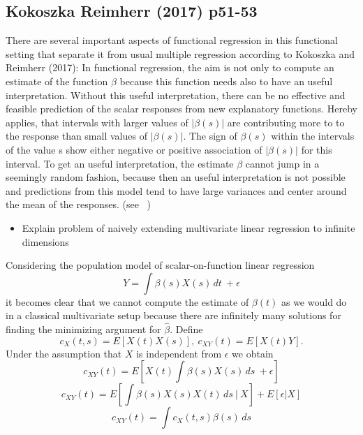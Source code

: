 \documentclass[11pt,twoside,a4paper]{article}
\begin{document}
\subsection{Kokoszka Reimherr (2017) p51-53}
There are several important aspects of functional regression in this functional setting that separate it from usual multiple regression according to Kokoszka and Reimherr (2017): In functional regression, the aim is not only to compute an estimate of the function $\beta$ because this function needs also to have an useful interpretation. Without this useful interpretation, there can be no effective and feasible prediction of the scalar responses from new explanatory functions. Hereby applies, that intervals with larger values of $|\beta(s)|$ are contributing more to to the response than small values of  $|\beta(s)|$. The sign of $\beta(s)$ within the intervals of the value s show either negative or positive association of  $|\beta(s)|$ for this interval. To get an useful interpretation, the estimate $\beta$ cannot jump in a seemingly random fashion, because then an useful interpretation is not possible and predictions from this model tend to have large variances and center around the mean of the responses. (see ~\cite{kokoszka_introduction_2017})
	
	\begin{itemize}
		\item Explain problem of naively extending multivariate linear regression to infinite dimensions
	\end{itemize}
	Considering the population model of scalar-on-function linear regression
	\begin{equation}
     Y =  \int \beta(s)X(s) \,dt \ +\epsilon
    \end{equation}
    it becomes clear that we cannot compute the estimate of $\beta(t)$ as we would do in a classical multivariate setup because there are infinitely many solutions for finding the minimizing argument for $\hat{\beta}$. Define 
    \begin{equation}
  	c_{X}(t,s) = E[X(t)X(s)],\: c_{XY}(t) = E[X(t)Y].
    \end{equation}
   Under the assumption that $X$ is independent from $\epsilon$ we obtain
   \begin{equation}
     c_{XY}(t) = E[X(t)\int \beta(s)X(s) \,ds \ +\epsilon]
   \end{equation}
    \begin{equation}
     c_{XY}(t) =  E[\int \beta(s)X(s)X(t)\,ds\:|\: X] + E[\epsilon |X]
  	\end{equation}
   	\begin{equation}
    	c_{XY}(t) = \int c_{X}(t,s) \beta(s) \,ds 
   \end{equation}
   
\end{document}
